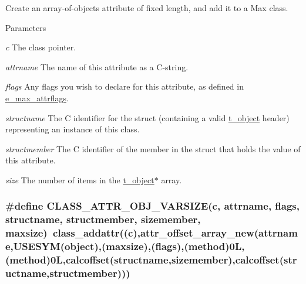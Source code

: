 Create an array-\/of-\/objects attribute of fixed length, and add it to a Max class. 
\begin{DoxyParams}{Parameters}
\item[{\em c}]The class pointer. \item[{\em attrname}]The name of this attribute as a C-\/string. \item[{\em flags}]Any flags you wish to declare for this attribute, as defined in \hyperlink{group__attr_gaf296cfc6741bb19207f6ed8062809115}{e\_\-max\_\-attrflags}. \item[{\em structname}]The C identifier for the struct (containing a valid \hyperlink{structt__object}{t\_\-object} header) representing an instance of this class. \item[{\em structmember}]The C identifier of the member in the struct that holds the value of this attribute. \item[{\em size}]The number of items in the \hyperlink{structt__object}{t\_\-object}$\ast$ array. \end{DoxyParams}
\hypertarget{group__attr_gab759b34dacbfce67de844f5711f7fc38}{
\subsubsection[{CLASS\_\-ATTR\_\-OBJ\_\-VARSIZE}]{\setlength{\rightskip}{0pt plus 5cm}\#define CLASS\_\-ATTR\_\-OBJ\_\-VARSIZE(c, \/  attrname, \/  flags, \/  structname, \/  structmember, \/  sizemember, \/  maxsize)~class\_\-addattr((c),attr\_\-offset\_\-array\_\-new(attrname,USESYM(object),(maxsize),(flags),({\bf method})0L,(method)0L,calcoffset(structname,sizemember),calcoffset(structname,structmember)))}}
\label{group__attr_gab759b34dacbfce67de844f5711f7fc38}


